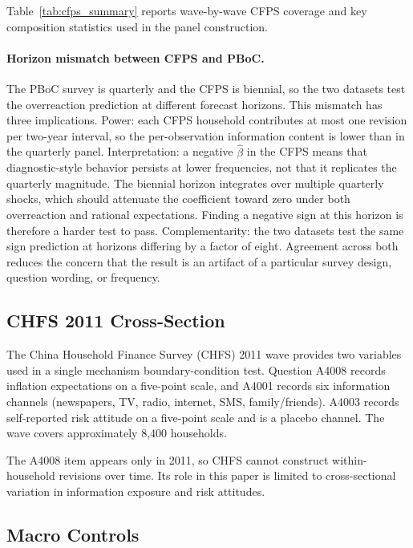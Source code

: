 Table~\ref{tab:cfps_summary} reports wave-by-wave CFPS
coverage and key composition statistics used in the panel
construction.


\paragraph{Horizon mismatch between CFPS and PBoC.}
The PBoC survey is quarterly and the CFPS is biennial, so the two
datasets test the overreaction prediction at different forecast
horizons. This mismatch has three implications. Power: each
CFPS household contributes at most one revision per two-year interval,
so the per-observation information content is lower than in the
quarterly panel. Interpretation: a negative $\hat{\beta}$ in
the CFPS means that diagnostic-style behavior persists at lower
frequencies, not that it replicates the quarterly magnitude. The
biennial horizon integrates over multiple quarterly shocks, which
should attenuate the coefficient toward zero under both overreaction
and rational expectations. Finding a negative sign at this horizon is
therefore a harder test to pass. Complementarity: the two
datasets test the same sign prediction at horizons differing by a
factor of eight. Agreement across both reduces the concern that the
result is an artifact of a particular survey design, question wording,
or frequency.

\subsection{CHFS 2011 Cross-Section}\label{sec:chfs_data}

The China Household Finance Survey (CHFS) 2011 wave
\citep{Gan2014} provides two variables used in a single
mechanism boundary-condition test. Question A4008 records
inflation expectations on a five-point scale, and A4001
records six information channels (newspapers, TV, radio,
internet, SMS, family/friends). A4003 records self-reported
risk attitude on a five-point scale and is a placebo
channel. The wave covers approximately 8,400 households.

The A4008 item appears only in 2011, so CHFS cannot
construct within-household revisions over time. Its role in
this paper is limited to cross-sectional variation in
information exposure and risk attitudes.



\subsection{Macro Controls}


